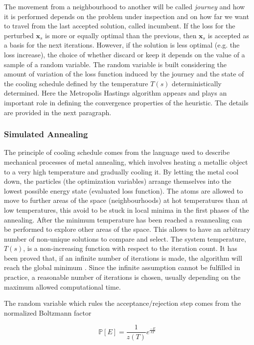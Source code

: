 The movement from a neighbourhood to another will be called \emph{journey} and how it is performed depends on the problem under inspection and on how far we want to travel from the last accepted solution, called incumbent. If the loss for the perturbed $\mathbf{x}_s$ is more or equally optimal than the previous, then $\mathbf{x}_s$ is accepted as a basis for the next iterations. However, if the solution is less optimal (e.g. the loss increase), the choice of whether discard or keep it depends on the value of a sample of a random variable. The random variable is built considering the amount of variation of the loss function induced by the journey and the state of the cooling schedule defined by the temperature $T(s)$ deterministically determined. Here the Metropolis Hastings algorithm appears and plays an important role in defining the convergence properties of the heuristic. The details are provided in the next paragraph.

\subsubsection{Simulated Annealing}

The principle of cooling schedule comes from the language used to describe mechanical processes of metal annealing, which involves heating a metallic object to a very high temperature and gradually cooling it. By letting the metal cool down, the particles (the optimization variables) arrange themselves into the lowest possible energy state (evaluated loss function). The atoms are allowed to move to further areas of the space (neighbourhoods) at hot temperatures than at low temperatures, this avoid to be stuck in local minima in the first phases of the annealing. After the minimum temperature has been reached a reannealing can be performed to explore other areas of the space. This allows to have an arbitrary number of non-unique solutions to compare and select. The system temperature, $T(s)$, is a non-increasing function with respect to the iteration count. It has been proved that, if an infinite number of iterations is made, the algorithm will reach the global minimum \parencite{belisle1992}. Since the infinite assumption cannot be fulfilled in practice, a reasonable number of iterations is chosen, usually depending on the maximum allowed computational time.

The random variable which rules the acceptance/rejection step comes from the normalized Boltzmann factor

\begin{equation}
\mathbb{P}\left[E\right]=\frac{1}{z(T)}e^{\frac{-E}{kT}}
\end{equation} 

